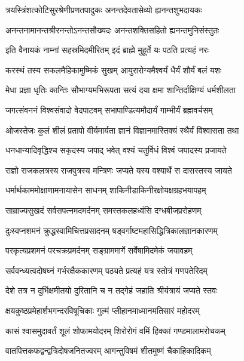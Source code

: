 \twolineshloka
{त्रयस्त्रिंशत्कोटिसुरश्रेणीप्रणतपादुकः}
{अनन्तदेवतासेव्यो ह्यनन्तशुभदायकः}%

\twolineshloka
{अनन्तनामानन्तश्रीरनन्तोऽनन्तसौख्यदः}
{अनन्तशक्तिसहितो ह्यनन्तमुनिसंस्तुतः}%


\twolineshloka
{इति वैनायकं नाम्नां सहस्रमिदमीरितम्}
{इदं ब्राह्मे मुहूर्ते यः पठति प्रत्यहं नरः}%

\twolineshloka
{करस्थं तस्य सकलमैहिकामुष्मिकं सुखम्}
{आयुरारोग्यमैश्वर्यं धैर्यं शौर्यं बलं यशः}%

\twolineshloka
{मेधा प्रज्ञा धृतिः कान्तिः सौभाग्यमभिरूपता}
{सत्यं दया क्षमा शान्तिर्दाक्षिण्यं धर्मशीलता}%

\twolineshloka
{जगत्संवननं विश्वसंवादो वेदपाटवम्}
{सभापाण्डित्यमौदार्यं गाम्भीर्यं ब्रह्मवर्चसम्}%

\twolineshloka
{ओजस्तेजः कुलं शीलं प्रतापो वीर्यमार्यता}
{ज्ञानं विज्ञानमास्तिक्यं स्थैर्यं विश्वासता तथा}%

\twolineshloka
{धनधान्यादिवृद्धिश्च सकृदस्य जपाद् भवेत्}
{वश्यं चतुर्विधं विश्वं जपादस्य प्रजायते}%

\twolineshloka
{राज्ञो राजकलत्रस्य राजपुत्रस्य मन्त्रिणः}
{जप्यते यस्य वश्यार्थे स दासस्तस्य जायते}%

\twolineshloka
{धर्मार्थकाममोक्षाणामनायासेन साधनम्}
{शाकिनीडाकिनीरक्षोयक्षग्रहभयापहम्}%

\twolineshloka
{साम्राज्यसुखदं सर्वसपत्नमदमर्दनम्}
{समस्तकलहध्वंसि दग्धबीजप्ररोहणम्}%

\twolineshloka
{दुःस्वप्नशमनं क्रुद्धस्वामिचित्तप्रसादनम्}
{षड्वर्गाष्टमहासिद्धित्रिकालज्ञानकारणम्}%

\twolineshloka
{परकृत्यप्रशमनं परचक्रप्रमर्दनम्}
{सङ्ग्राममार्गे सर्वेषामिदमेकं जयावहम्}%

\twolineshloka
{सर्ववन्ध्यत्वदोषघ्नं गर्भरक्षैककारणम्}
{पठ्यते प्रत्यहं यत्र स्तोत्रं गणपतेरिदम्}%

\twolineshloka
{देशे तत्र न दुर्भिक्षमीतयो दुरितानि च}
{न तद्गेहं जहाति श्रीर्यत्रायं जप्यते स्तवः}%

\twolineshloka
{क्षयकुष्ठप्रमेहार्शभगन्दरविषूचिकाः}
{गुल्मं प्लीहानमाध्मानमतिसारं महोदरम्}%

\twolineshloka
{कासं श्वासमुदावर्तं शूलं शोफामयोदरम्}
{शिरोरोगं वमिं हिक्कां गण्डमालामरोचकम्}%

\twolineshloka
{वातपित्तकफद्वन्द्वत्रिदोषजनितज्वरम्}
{आगन्तुविषमं शीतमुष्णं चैकाहिकादिकम्}%

